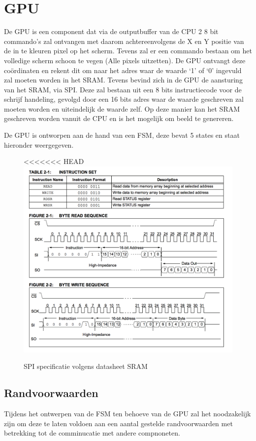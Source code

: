 \documentclass[oneside,dutch]{tudelft-report}
\begin{document}
\chapter{GPU}
De GPU is een component dat via de outputbuffer van de CPU 2 8 bit commando’s zal ontvangen met daarom achtereenvolgens de X en Y positie van de in te kleuren pixel op het scherm. Tevens zal er een commando bestaan om het volledige scherm schoon te vegen (Alle pixels uitzetten). De GPU ontvangt deze coördinaten en rekent dit om naar het adres waar de waarde ‘1’ of ‘0’ ingevuld zal moeten worden in het SRAM. Tevens bevind zich in de GPU de aansturing van het SRAM, via SPI. Deze zal bestaan uit een 8 bits instructiecode voor de schrijf handeling, gevolgd door een 16 bits adres waar de waarde geschreven zal moeten worden en uiteindelijk de waarde zelf. Op deze manier kan het SRAM geschreven worden vanuit de CPU en is het mogelijk om beeld te genereren.

De GPU is ontworpen aan de hand van een FSM, deze bevat 5 states en staat hieronder weergegeven.

\begin{figure}[H]
\center
<<<<<<< HEAD
\includegraphics[width=15cm]{sramcomm}
\caption{SPI specificatie volgens datasheet SRAM}
\label{sram}
\end{figure}

\section{Randvoorwaarden}
Tijdens het ontwerpen van de FSM ten behoeve van de GPU zal het noodzakelijk zijn om deze te laten voldoen aan een aantal gestelde randvoorwaarden met betrekking tot de comminucatie met andere compnoneten.
\end{document}
